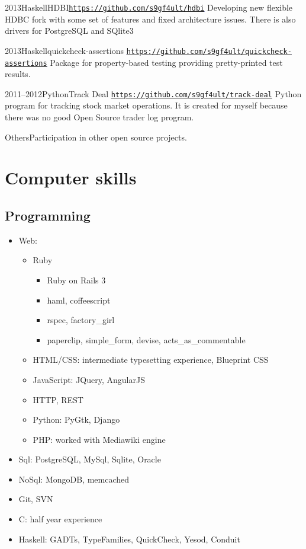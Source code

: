 \documentclass[11pt,a4paper,sans]{moderncv}        %
\newcommand*{\hlink}[1]{\textcolor{blue}{\texttt{\underline{\href{#1}{#1}}}}}
\begin{document}
\cventry
    {2013}{Haskell}{HDBI}{\hlink{https://github.com/s9gf4ult/hdbi}}{}
    {Developing new flexible HDBC fork with some set of features and fixed
      architecture issues. There is also drivers for PostgreSQL and SQlite3}

\cventry
    {2013}{Haskell}{quickcheck-assertions}%
    {\hlink{https://github.com/s9gf4ult/quickcheck-assertions}}{}{%
      Package for property-based testing providing pretty-printed test results.}

\cventry
    {2011--2012}{Python}{Track Deal}%
    {\hlink{https://github.com/s9gf4ult/track-deal}}{}
    {Python program for tracking stock market operations. It is created for
      myself because there was no good Open Source trader log program.}

\cvitem
    {Others}{Participation in other open source projects.}


\section{Computer skills}

\subsection{Programming}

\begin{itemize}
\item Web:
  \begin{itemize}
  \item Ruby
    \begin{itemize}
    \item Ruby on Rails 3
    \item haml, coffeescript
    \item rspec, factory\_girl
    \item paperclip, simple\_form, devise, acts\_as\_commentable
    \end{itemize}
  \item HTML/CSS: intermediate typesetting experience, Blueprint CSS
  \item JavaScript: JQuery, AngularJS
  \item HTTP, REST
  \item Python: PyGtk, Django
  \item PHP: worked with Mediawiki engine
  \end{itemize}
\item Sql: PostgreSQL, MySql, Sqlite, Oracle
\item NoSql: MongoDB, memcached
\item Git, SVN
\item C: half year experience
\item Haskell: GADTs, TypeFamilies, QuickCheck, Yesod, Conduit
\end{itemize}
\end{document}
